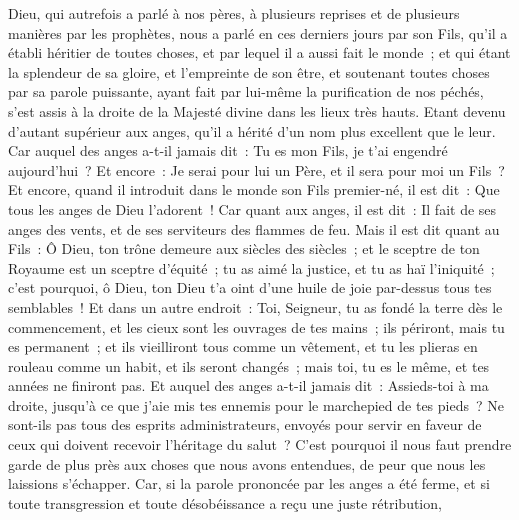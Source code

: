\begin{multicols}{2}
\VerseOne{}Dieu, qui autrefois a parlé à nos pères, à plusieurs reprises et de plusieurs manières par les prophètes,
nous a parlé en ces derniers jours par son Fils, qu'il a établi héritier de toutes choses, et par lequel il a aussi fait le monde~;
et qui étant la splendeur de sa gloire, et l'empreinte de son être, et soutenant toutes choses par sa parole puissante, ayant fait par lui-même la purification de nos péchés, s'est assis à la droite de la Majesté divine dans les lieux très hauts.
Etant devenu d'autant supérieur aux anges, qu'il a hérité d'un nom plus excellent que le leur.
Car auquel des anges a-t-il jamais dit~: Tu es mon Fils, je t'ai engendré aujourd'hui~? Et encore~: Je serai pour lui un Père, et il sera pour moi un Fils~?
Et encore, quand il introduit dans le monde son Fils premier-né, il est dit~: Que tous les anges de Dieu l'adorent~!
Car quant aux anges, il est dit~: Il fait de ses anges des vents, et de ses serviteurs des flammes de feu.
Mais il est dit quant au Fils~: Ô Dieu, ton trône demeure aux siècles des siècles~; et le sceptre de ton Royaume est un sceptre d'équité~;
tu as aimé la justice, et tu as haï l'iniquité~; c'est pourquoi, ô Dieu, ton Dieu t'a oint d'une huile de joie par-dessus tous tes semblables~!
Et dans un autre endroit~: Toi, Seigneur, tu as fondé la terre dès le commencement, et les cieux sont les ouvrages de tes mains~;
ils périront, mais tu es permanent~; et ils vieilliront tous comme un vêtement,
et tu les plieras en rouleau comme un habit, et ils seront changés~; mais toi, tu es le même, et tes années ne finiront pas.
Et auquel des anges a-t-il jamais dit~: Assieds-toi à ma droite, jusqu'à ce que j'aie mis tes ennemis pour le marchepied de tes pieds~?
Ne sont-ils pas tous des esprits administrateurs, envoyés pour servir en faveur de ceux qui doivent recevoir l'héritage du salut~?
\VerseOne{}C'est pourquoi il nous faut prendre garde de plus près aux choses que nous avons entendues, de peur que nous les laissions s'échapper.
Car, si la parole prononcée par les anges a été ferme, et si toute transgression et toute désobéissance a reçu une juste rétribution,

\end{multicols}
